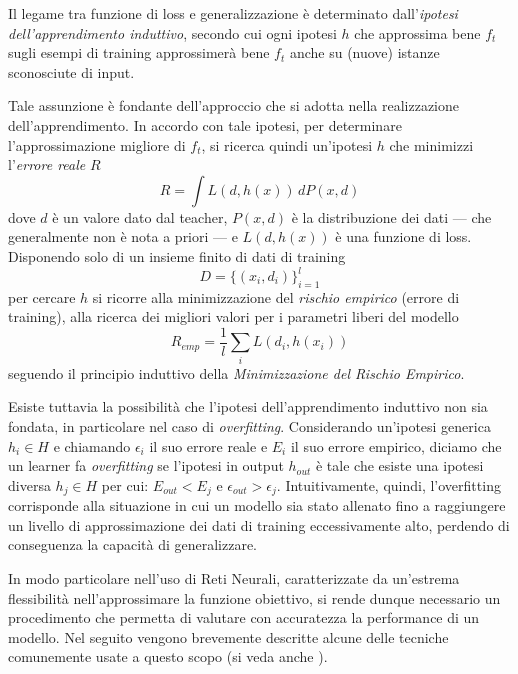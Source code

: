Il legame tra funzione di loss e generalizzazione è determinato dall'\emph{ipotesi dell'apprendimento induttivo}, secondo cui ogni ipotesi $h$ che approssima bene $f_t$ sugli esempi di training approssimerà bene $f_t$ anche su (nuove) istanze sconosciute di input.

Tale assunzione è fondante dell'approccio che si adotta nella realizzazione dell'apprendimento.
In accordo con tale ipotesi, per determinare l'approssimazione migliore di $f_t$, si ricerca quindi un'ipotesi $h$ che minimizzi l'\emph{errore reale} $R$
\begin{equation}
R = \int L(d, h(x))\, dP(x,d)  
\end{equation}
dove $d$ è un valore dato dal teacher, $P(x,d)$ è la distribuzione dei dati --- che generalmente non è nota a priori --- e $L(d, h(x))$ è una funzione di loss.\\
Disponendo solo di un insieme finito di dati di training
\begin{equation} 
D = \lbrace (x_i, d_i) \rbrace_{i=1}^{l}  
\end{equation}
per cercare $h$ si ricorre alla minimizzazione del \emph{rischio empirico} (errore di training), alla ricerca dei migliori valori per i parametri liberi del modello
\begin{equation}
R_{emp} = \frac{1}{l} \sum_{i} L(d_i, h(x_i))
\end{equation}
seguendo il principio induttivo della \emph{Minimizzazione del Rischio Empirico}.

Esiste tuttavia la possibilità che l'ipotesi dell'apprendimento induttivo non sia fondata, in particolare nel caso di \emph{overfitting}.
Considerando un'ipotesi generica $h_i \in H$ e chiamando $\epsilon_i$ il suo errore reale e $E_i$ il suo errore empirico, diciamo che un learner fa \emph{overfitting} se l'ipotesi in output $h_{out}$ è tale che esiste una ipotesi diversa $h_j \in H$ per cui: $E_{out} < E_j$ e $\epsilon_{out} > \epsilon_j $.
Intuitivamente, quindi, l'overfitting corrisponde alla situazione in cui un modello sia stato allenato fino a raggiungere un livello di approssimazione dei dati di training eccessivamente alto, perdendo di conseguenza la capacità di generalizzare.

In modo particolare nell'uso di Reti Neurali, caratterizzate da un'estrema flessibilità nell'approssimare la funzione obiettivo, si rende dunque necessario un procedimento che permetta di valutare con accuratezza la performance di un modello. Nel seguito vengono brevemente descritte alcune delle tecniche comunemente usate a questo scopo (si veda anche \cite{Hastie:EOSL}).

